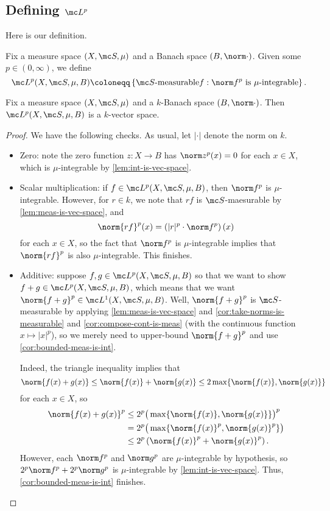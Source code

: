 \documentclass[../notes.tex]{subfiles}
\begin{document}
\subsection{Defining \texorpdfstring{$\mc L^p$}{ Lp}}
Here is our definition.
\begin{defihelper} 
	Fix a measure space $(X,\mc S,\mu)$ and a Banach space $(B,\norm\cdot)$. Given some $p\in(0,\infty)$, we define
	\[\mc L^p(X,\mc S,\mu,B)\coloneqq\left\{\mc S\text{-measurable}f:\norm f^p\text{ is }\mu\text{-integrable}\right\}.\]
\end{defihelper}
\begin{lemma}
	Fix a measure space $(X,\mc S,\mu)$ and a $k$-Banach space $(B,\norm\cdot)$. Then $\mc L^p(X,\mc S,\mu,B)$ is a $k$-vector space.
\end{lemma}
\begin{proof}
	We have the following checks. As usual, let $|\cdot|$ denote the norm on $k$.
	\begin{itemize}
		\item Zero: note the zero function $z\colon X\to B$ has $\norm z^p(x)=0$ for each $x\in X$, which is $\mu$-integrable by \autoref{lem:int-is-vec-space}.
		\item Scalar multiplication: if $f\in\mc L^p(X,\mc S,\mu,B)$, then $\norm f^p$ is $\mu$-integrable. However, for $r\in k$, we note that $rf$ is $\mc S$-maesurable by \autoref{lem:meas-is-vec-space}, and
		\[\norm{rf}^p(x)=\left(|r|^p\cdot\norm f^p\right)(x)\]
		for each $x\in X$, so the fact that $\norm f^p$ is $\mu$-integrable implies that $\norm{rf}^p$ is also $\mu$-integrable. This finishes.
		\item Additive: suppose $f,g\in\mc L^p(X,\mc S,\mu,B)$ so that we want to show $f+g\in\mc L^p(X,\mc S,\mu,B)$, which means that we want $\norm{f+g}^p\in\mc L^1(X,\mc S,\mu,B)$. Well, $\norm{f+g}^p$ is $\mc S$-measurable by applying \autoref{lem:meas-is-vec-space} and \autoref{cor:take-norms-is-measurable} and \autoref{cor:compose-cont-is-meas} (with the continuous function $x\mapsto|x|^p$), so we merely need to upper-bound $\norm{f+g}^p$ and use \autoref{cor:bounded-meas-is-int}.
		
		Indeed, the triangle inequality implies that
		\[\norm{f(x)+g(x)}\le\norm{f(x)}+\norm{g(x)}\le2\max\{\norm{f(x)},\norm{g(x)}\}\]
		for each $x\in X$, so
		\begin{align*}
			\norm{f(x)+g(x)}^p &\le 2^p\big(\max\{\norm{f(x)},\norm{g(x)}\}\big)^p \\
			&= 2^p\big(\max\{\norm{f(x)}^p,\norm{g(x)}^p\}\big) \\
			&\le 2^p\left(\norm{f(x)}^p+\norm{g(x)}^p\right).
		\end{align*}
		However, each $\norm f^p$ and $\norm g^p$ are $\mu$-integrable by hypothesis, so $2^p\norm f^p+2^p\norm g^p$ is $\mu$-integrable by \autoref{lem:int-is-vec-space}. Thus, \autoref{cor:bounded-meas-is-int} finishes.
		\qedhere
	\end{itemize}
\end{proof}
\end{document}
